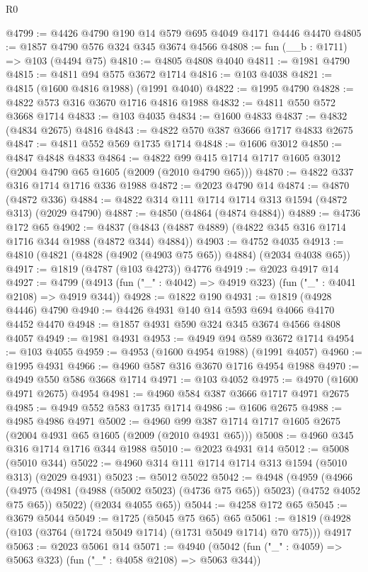 \begin{lexlean}{R0}
\begin{coremodule}
@4799 := @4426 @4790 @190 @14 @579 @695 @4049 @4171 @4446 @4470
@4805 := @1857 @4790 @576 @324 @345 @3674 @4566
@4808 := fun (__b : @1711) => @103 (@4494 @75)
@4810 := @4805 @4808 @4040
@4811 := @1981 @4790
@4815 := @4811 @94 @575 @3672 @1714
@4816 := @103 @4038
@4821 := @4815 (@1600 @4816 @1988) (@1991 @4040)
@4822 := @1995 @4790
@4828 := @4822 @573 @316 @3670 @1716 @4816 @1988
@4832 := @4811 @550 @572 @3668 @1714
@4833 := @103 @4035
@4834 := @1600 @4833
@4837 := @4832 (@4834 @2675) @4816
@4843 := @4822 @570 @387 @3666 @1717 @4833 @2675
@4847 := @4811 @552 @569 @1735 @1714
@4848 := @1606 @3012
@4850 := @4847 @4848 @4833
@4864 := @4822 @99 @415 @1714 @1717 @1605 @3012 (@2004 @4790 @65 @1605 (@2009 (@2010 @4790 @65)))
@4870 := @4822 @337 @316 @1714 @1716 @336 @1988
@4872 := @2023 @4790 @14
@4874 := @4870 (@4872 @336)
@4884 := @4822 @314 @111 @1714 @1714 @313 @1594 (@4872 @313) (@2029 @4790)
@4887 := @4850 (@4864 (@4874 @4884))
@4889 := @4736 @172 @65
@4902 := @4837 (@4843 (@4887 @4889) (@4822 @345 @316 @1714 @1716 @344 @1988 (@4872 @344) @4884))
@4903 := @4752 @4035
@4913 := @4810 (@4821 (@4828 (@4902 (@4903 @75 @65)) @4884) (@2034 @4038 @65))
@4917 := @1819 (@4787 (@103 @4273)) @4776
@4919 := @2023 @4917 @14
@4927 := @4799 (@4913 (fun ("_" : @4042) => @4919 @323) (fun ("_" : @4041 @2108) => @4919 @344))
@4928 := @1822 @190
@4931 := @1819 (@4928 @4446) @4790
@4940 := @4426 @4931 @140 @14 @593 @694 @4066 @4170 @4452 @4470
@4948 := @1857 @4931 @590 @324 @345 @3674 @4566 @4808 @4057
@4949 := @1981 @4931
@4953 := @4949 @94 @589 @3672 @1714
@4954 := @103 @4055
@4959 := @4953 (@1600 @4954 @1988) (@1991 @4057)
@4960 := @1995 @4931
@4966 := @4960 @587 @316 @3670 @1716 @4954 @1988
@4970 := @4949 @550 @586 @3668 @1714
@4971 := @103 @4052
@4975 := @4970 (@1600 @4971 @2675) @4954
@4981 := @4960 @584 @387 @3666 @1717 @4971 @2675
@4985 := @4949 @552 @583 @1735 @1714
@4986 := @1606 @2675
@4988 := @4985 @4986 @4971
@5002 := @4960 @99 @387 @1714 @1717 @1605 @2675 (@2004 @4931 @65 @1605 (@2009 (@2010 @4931 @65)))
@5008 := @4960 @345 @316 @1714 @1716 @344 @1988
@5010 := @2023 @4931 @14
@5012 := @5008 (@5010 @344)
@5022 := @4960 @314 @111 @1714 @1714 @313 @1594 (@5010 @313) (@2029 @4931)
@5023 := @5012 @5022
@5042 := @4948
    (@4959
      (@4966
        (@4975 (@4981 (@4988 (@5002 @5023) (@4736 @75 @65)) @5023) (@4752 @4052 @75 @65))
        @5022)
      (@2034 @4055 @65))
@5044 := @4258 @172 @65
@5045 := @3679 @5044
@5049 := @1725 (@5045 @75 @65) @65
@5061 := @1819 (@4928 (@103 (@3764 (@1724 @5049 @1714) (@1731 @5049 @1714) @70 @75))) @4917
@5063 := @2023 @5061 @14
@5071 := @4940 (@5042 (fun ("_" : @4059) => @5063 @323) (fun ("_" : @4058 @2108) => @5063 @344))

\end{coremodule}
\end{lexlean}
